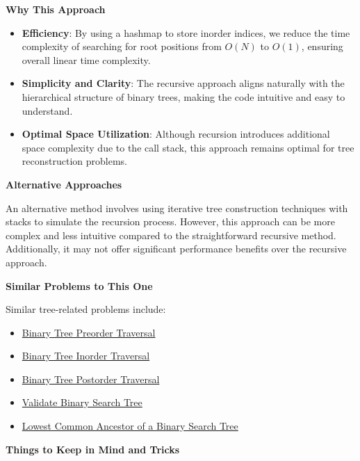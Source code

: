 \textbf{Why This Approach}

\begin{itemize}
    \item \textbf{Efficiency}: By using a hashmap to store inorder indices, we reduce the time complexity of searching for root positions from \(O(N)\) to \(O(1)\), ensuring overall linear time complexity.
    \item \textbf{Simplicity and Clarity}: The recursive approach aligns naturally with the hierarchical structure of binary trees, making the code intuitive and easy to understand.
    \item \textbf{Optimal Space Utilization}: Although recursion introduces additional space complexity due to the call stack, this approach remains optimal for tree reconstruction problems.
\end{itemize}

\textbf{Alternative Approaches}

An alternative method involves using iterative tree construction techniques with stacks to simulate the recursion process. However, this approach can be more complex and less intuitive compared to the straightforward recursive method. Additionally, it may not offer significant performance benefits over the recursive approach.

\textbf{Similar Problems to This One}

Similar tree-related problems include:
\begin{itemize}
    \item \hyperref[problem:binary_tree_preorder_traversal]{Binary Tree Preorder Traversal}
    \item \hyperref[problem:binary_tree_inorder_traversal]{Binary Tree Inorder Traversal}
    \item \hyperref[problem:binary_tree_postorder_traversal]{Binary Tree Postorder Traversal}
    \item \hyperref[problem:validate_binary_search_tree]{Validate Binary Search Tree}
    \item \hyperref[problem:lowest_common_ancestor_of_a_binary_search_tree]{Lowest Common Ancestor of a Binary Search Tree}
\end{itemize}

\textbf{Things to Keep in Mind and Tricks}

